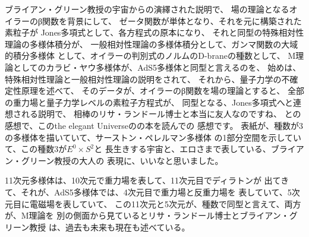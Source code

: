 \documentclass{jsarticle}
\begin{document}
\title{}
\author{}
\date{}
\maketitle

       ブライアン・グリーン教授の宇宙からの演繹された説明で、
    場の理論となるオイラーのβ関数を背景にして、
    ゼータ関数が単体となり、それを元に構築された素粒子が
    Jones多項式として、各方程式の原本になり、
    それと同型の特殊相対性理論の多様体積分が、
    一般相対性理論の多様体積分として、ガンマ関数の大域的積分多様体
    として、オイラーの判別式のノルムのD-braneの種数として、
    M理論としてのカラビ・ヤウ多様体が、AdS5多様体と同型と言えるのを、
    始めは、特殊相対性理論と一般相対性理論の説明をされて、
    それから、量子力学の不確定性原理を述べて、
    そのデータが、オイラーのβ関数を場の理論とすると、
    全部の重力場と量子力学レベルの素粒子方程式が、
    同型となる、Jones多項式へと連想される説明で、
    相棒のリサ・ランドール博士と本当に友人なのですね、
    との感想で、このthe elegant Universeのの本を読んでの
    感想です。
    表紙が、種数が3の多様体を描いていて、サーストン・ペレルマン多様体
    の1部分空間を示していて、この種数3が$E^{0}\times S^{2} $と
    長生きする宇宙と、エロさまで表している、ブライアン・グリーン教授の大人の
    表現に、いいなと思いました。

    11次元多様体は、10次元で重力場を表して、11次元目でディラトンが
    出てきて、それが、AdS5多様体では、4次元目で重力場と反重力場を
    表していて、5次元目に電磁場を表していて、
    この11次元と5次元が、種数で同型と言えて、両方が、M理論を
    別の側面から見ているとリサ・ランドール博士とブライアン・グリーン教授
    は、過去も未来も現在も述べている。
\end{document}

